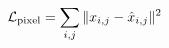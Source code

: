 \documentclass[preview]{standalone}
\begin{document}
\begin{align*}
\special{dvisvgm:raw <g id='unique000'>}\mathcal{L}_{\text{pixel}} = \sum_{i,j} \| x_{i,j} - \hat{x}_{i,j} \|^2\special{dvisvgm:raw </g>}
\end{align*}
\end{document}
